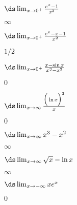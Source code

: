 \begin{multicols}{2}[]
\begin{enumialphparenastyle}
\begin{ex}
\end{ex}

\begin{ex} 
{$\ds \lim_{x\to 0^+} \frac{e^x-1}{x^2}$}
 
\begin{sol}
 {$\infty$}
\end{sol}

\end{ex}

\begin{ex} 
 {$\ds \lim_{x\to 0^+} \frac{e^x-x-1}{x^2}$}

\begin{sol}
  {$1/2$}
\end{sol}

\end{ex}

\begin{ex} 
 {$\ds \lim_{x\to 0^+} \frac{x-\sin x}{x^3-x^2}$}

\begin{sol}
  {$0$}
\end{sol}

\end{ex}

\begin{ex} 
 {$\ds \lim_{x\to \infty} \frac{\Big(\ln x\Big)^2}{x}$}

\begin{sol}
  {$0$}
\end{sol}

\end{ex}

\begin{ex} 
 {$\ds \lim_{x\to \infty} x^3-x^2$}
 
\begin{sol}
 {$\infty$}
\end{sol}

\end{ex}

\begin{ex} 
{$\ds \lim_{x\to \infty} \sqrt{x}-\ln x$}

\begin{sol}
 {$\infty$} 
\end{sol}

\end{ex}

\begin{ex} 
{$\ds \lim_{x\to -\infty} xe^x$}

\begin{sol}
 {$0$} 
\end{sol}


\end{ex}
\end{enumialphparenastyle}
\end{multicols}
